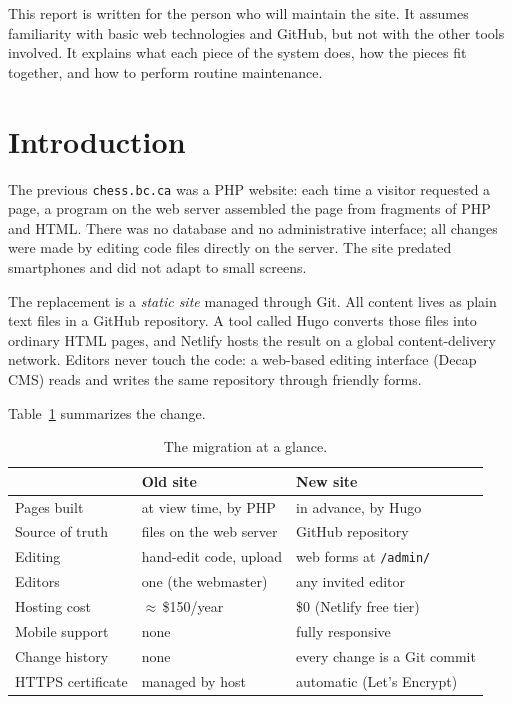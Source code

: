 \documentclass[12pt,letterpaper]{article}
\begin{document}
This report is written for the person who will maintain the site. It assumes
familiarity with basic web technologies and GitHub, but not with the other
tools involved. It explains what each piece of the system does, how the
pieces fit together, and how to perform routine maintenance.

\newpage
\tableofcontents
\newpage

\section{Introduction}

The previous \texttt{chess.bc.ca} was a PHP website: each time a visitor
requested a page, a program on the web server assembled the page from
fragments of PHP and HTML. There was no database and no administrative
interface; all changes were made by editing code files directly on the
server. The site predated smartphones and did not adapt to small screens.

The replacement is a \emph{static site} managed through Git. All content
lives as plain text files in a GitHub repository. A tool called Hugo
converts those files into ordinary HTML pages, and Netlify hosts the result
on a global content-delivery network. Editors never touch the code: a
web-based editing interface (Decap CMS) reads and writes the same repository
through friendly forms.

Table~\ref{tab:oldnew} summarizes the change.

\begin{table}[h]
\centering
\begin{tabular}{@{}lll@{}}
\toprule
 & \textbf{Old site} & \textbf{New site} \\
\midrule
Pages built & at view time, by PHP & in advance, by Hugo \\
Source of truth & files on the web server & GitHub repository \\
Editing & hand-edit code, upload & web forms at \texttt{/admin/} \\
Editors & one (the webmaster) & any invited editor \\
Hosting cost & $\approx$\,\$150/year & \$0 (Netlify free tier) \\
Mobile support & none & fully responsive \\
Change history & none & every change is a Git commit \\
HTTPS certificate & managed by host & automatic (Let's Encrypt) \\
\bottomrule
\end{tabular}
\caption{The migration at a glance.}
\label{tab:oldnew}
\end{table}
\end{document}
